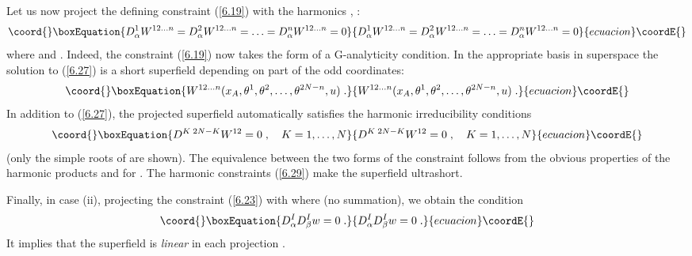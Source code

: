 \documentclass[a4paper,12pt]{article}
\begin{document}
Let us now project the defining constraint (\ref{6.19}) with the 
harmonics \coordHE{}, \coordHE{}: 
\begin{equation}\coord{}\boxEquation{\label{6.27}
D^1_\alpha W^{12\ldots n} = D^2_\alpha W^{12\ldots n}= \ldots =  
D^n_\alpha W^{12\ldots n} =0 
}{D^1_\alpha W^{12\ldots n} = D^2_\alpha W^{12\ldots n}= \ldots =  
D^n_\alpha W^{12\ldots n} =0 
}{ecuacion}\coordE{}\end{equation}
where \coordHE{} and \coordHE{}. Indeed, the 
constraint (\ref{6.19}) now takes the form of a G-analyticity 
condition. In the appropriate basis in superspace the solution to 
(\ref{6.27}) is a short superfield depending on part of the odd 
coordinates: 
\begin{equation}\coord{}\boxEquation{\label{6.28}
W^{12\ldots n}(x_A,\theta^1,\theta^2,\ldots, \theta^{2N-n},u)\;. 
}{W^{12\ldots n}(x_A,\theta^1,\theta^2,\ldots, \theta^{2N-n},u)\;. 
}{ecuacion}\coordE{}\end{equation}
In addition to (\ref{6.27}), the projected superfield \coordHE{} automatically satisfies the \coordHE{} harmonic 
irreducibility conditions 
\begin{equation}\coord{}\boxEquation{\label{6.29}
   D^{K\; 2N-K}W^{12} = 0\;, \quad K=1,\ldots,N
}{D^{K\; 2N-K}W^{12} = 0\;, \quad K=1,\ldots,N
}{ecuacion}\coordE{}\end{equation}
(only the simple roots of \coordHE{} are shown). The 
equivalence between the two forms of the constraint follows from 
the obvious properties of the harmonic products \coordHE{} and \coordHE{} for \coordHE{}. The 
harmonic constraints (\ref{6.29}) make the superfield ultrashort. 

Finally, in case (ii), projecting the constraint (\ref{6.23}) with 
\coordHE{} where \coordHE{} (no summation), we obtain the 
condition 
\begin{equation}\coord{}\boxEquation{\label{6.30'}
  D^I_\alpha D^I_\beta w=0\;.
}{D^I_\alpha D^I_\beta w=0\;.
}{ecuacion}\coordE{}\end{equation}
It implies that the superfield \coordHE{} is {\sl linear} in each 
projection \coordHE{}. 
 
\end{document}
